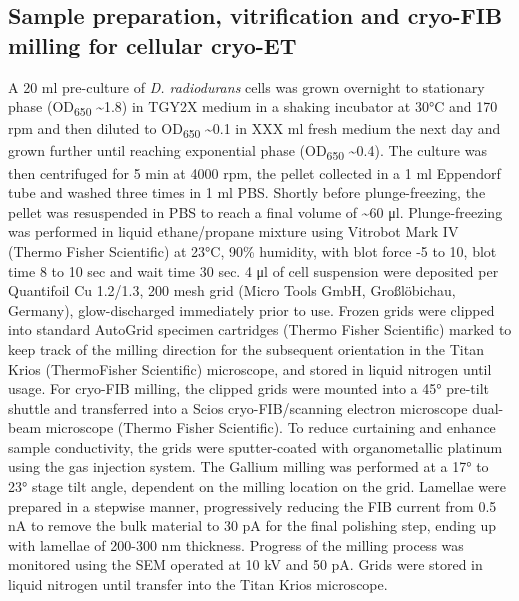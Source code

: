 \subsection{Sample preparation, vitrification and cryo-FIB milling for cellular cryo-ET}\label{drad_lamellae_method}
A 20 ml pre-culture of \textit{D. radiodurans} cells was grown overnight to stationary phase (OD\textsubscript{650} \sim1.8) in TGY2X medium in a shaking incubator at 30°C and 170 rpm and then diluted to OD\textsubscript{650} \sim0.1 in XXX ml fresh medium the next day and grown further until reaching exponential phase (OD\textsubscript{650} \sim0.4).
The culture was then centrifuged for 5 min at 4000 rpm, the pellet collected in a 1 ml Eppendorf tube and washed three times in 1 ml PBS.
Shortly before plunge-freezing, the pellet was resuspended in PBS to reach a final volume of \sim60 μl.
Plunge-freezing was performed in liquid ethane/propane mixture using Vitrobot Mark IV (Thermo Fisher Scientific) at 23°C, 90\% humidity, with blot force -5 to 10, blot time 8 to 10 sec and wait time 30 sec.
4 μl of cell suspension were deposited per Quantifoil Cu 1.2/1.3, 200 mesh grid (Micro Tools GmbH, Großlöbichau, Germany), glow-discharged immediately prior to use.
Frozen grids were clipped into standard AutoGrid specimen cartridges (Thermo Fisher Scientific) marked to keep track of the milling direction for the subsequent orientation in the Titan Krios (ThermoFisher Scientific) microscope, and stored in liquid nitrogen until usage.
For cryo-FIB milling, the clipped grids were mounted into a 45° pre-tilt shuttle and transferred into a Scios cryo-FIB/scanning electron microscope dual-beam microscope (Thermo Fisher Scientific).
To reduce curtaining and enhance sample conductivity, the grids were sputter-coated with organometallic platinum using the gas injection system.
The Gallium milling was performed at a 17° to 23° stage tilt angle, dependent on the milling location on the grid.
Lamellae were prepared in a stepwise manner, progressively reducing the FIB current from 0.5 nA to remove the bulk material to 30 pA for the final polishing step, ending up with lamellae of 200-300 nm thickness.
Progress of the milling process was monitored using the SEM operated at 10 kV and 50 pA.
Grids were stored in liquid nitrogen until transfer into the Titan Krios microscope.

